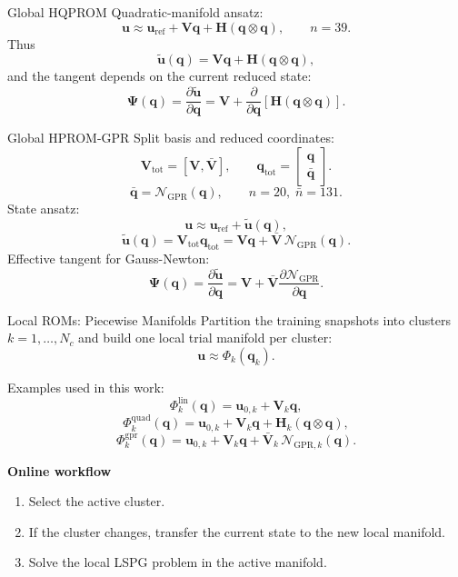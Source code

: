 \documentclass{beamer}
\begin{document}
\begin{frame}{Global HQPROM}
\small
Quadratic-manifold ansatz:
\[
\mathbf{u}\approx
\mathbf{u}_{\mathrm{ref}}
+\mathbf{V}\mathbf{q}
+\mathbf{H}\left(\mathbf{q}\otimes\mathbf{q}\right),
\qquad
n=39.
\]
Thus
\[
\widetilde{\mathbf{u}}(\mathbf{q})
=\mathbf{V}\mathbf{q}
+\mathbf{H}\left(\mathbf{q}\otimes\mathbf{q}\right),
\]
and the tangent depends on the current reduced state:
\[
\mathbf{\Psi}(\mathbf{q})
=\frac{\partial\widetilde{\mathbf{u}}}{\partial\mathbf{q}}
=\mathbf{V}
+\frac{\partial}{\partial\mathbf{q}}
\!\left[\mathbf{H}\left(\mathbf{q}\otimes\mathbf{q}\right)\right].
\]
\end{frame}

\begin{frame}{Global HPROM-GPR}
\small
Split basis and reduced coordinates:
\[
\mathbf{V}_{\mathrm{tot}}=[\mathbf{V},\bar{\mathbf{V}}],
\qquad
\mathbf{q}_{\mathrm{tot}}=
\begin{bmatrix}
\mathbf{q}\\
\bar{\mathbf{q}}
\end{bmatrix}.
\]
\[
\bar{\mathbf{q}}=\mathcal{N}_{\mathrm{GPR}}(\mathbf{q}),
\qquad
n=20,\;\bar{n}=131.
\]
State ansatz:
\[
\mathbf{u}\approx
\mathbf{u}_{\mathrm{ref}}
+\widetilde{\mathbf{u}}(\mathbf{q}),
\]
\[
\widetilde{\mathbf{u}}(\mathbf{q})
=\mathbf{V}_{\mathrm{tot}}\mathbf{q}_{\mathrm{tot}}
=\mathbf{V}\mathbf{q}
+\bar{\mathbf{V}}\,\mathcal{N}_{\mathrm{GPR}}(\mathbf{q}).
\]
Effective tangent for Gauss-Newton:
\[
\mathbf{\Psi}(\mathbf{q})
=\frac{\partial\widetilde{\mathbf{u}}}{\partial\mathbf{q}}
=\mathbf{V}
+\bar{\mathbf{V}}\frac{\partial\mathcal{N}_{\mathrm{GPR}}}{\partial\mathbf{q}}.
\]
\end{frame}

\begin{frame}{Local ROMs: Piecewise Manifolds}
\small
Partition the training snapshots into clusters $k=1,\dots,N_c$ and build one local trial manifold per cluster:
\[
\mathbf u \approx \Phi_k(\mathbf q_k).
\]

Examples used in this work:
\[
\Phi_k^{\mathrm{lin}}(\mathbf q)
=
\mathbf u_{0,k}+\mathbf V_k\mathbf q,
\]
\[
\Phi_k^{\mathrm{quad}}(\mathbf q)
=
\mathbf u_{0,k}+\mathbf V_k\mathbf q+\mathbf H_k(\mathbf q\otimes\mathbf q),
\]
\[
\Phi_k^{\mathrm{gpr}}(\mathbf q)
=
\mathbf u_{0,k}+\mathbf V_k\mathbf q+\bar{\mathbf V}_k\,\mathcal N_{\mathrm{GPR},k}(\mathbf q).
\]

\vspace{0.3em}
\textbf{Online workflow}
\begin{enumerate}
\item Select the active cluster.
\item If the cluster changes, transfer the current state to the new local manifold.
\item Solve the local LSPG problem in the active manifold.
\end{enumerate}
\end{frame}
\end{document}
